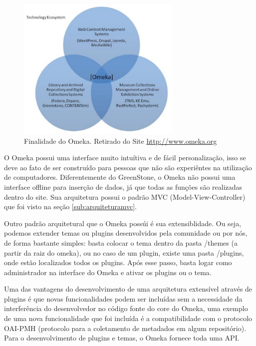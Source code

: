 \graphicspath{{figuras/}}
\begin{figure}[H]
\centering
\includegraphics[width=0.7\textwidth]{finalidade_omeka}
\caption[Finalidade do Omeka]{Finalidade do Omeka. Retirado do Site \url{http://www.omeka.org}}
\label{fig:finalidadeomeka}
\end{figure}

O Omeka possui uma interface muito intuítiva e de fácil personalização, isso se deve ao fato de ser construído para pessoas que não são experiêntes na utilização de computadores. Diferentemente do GreenStone, o Omeka não possui uma interface offline para inserção de dados, já que todas as funções são realizadas dentro do site. Sua arquitetura possui o padrão MVC (Model-View-Controller) que foi visto na seção \ref{sub:arquiteturamvc}.  

Outro padrão arquitetural que o Omeka possúi é sua extensiblidade. Ou seja, podemos extender temas ou plugins desenvolvidos pela comunidade ou por nós, de forma bastante simples: basta colocar o tema dentro da pasta /themes (a partir da raiz do omeka), ou no caso de um plugin, existe uma pasta /plugins, onde estão localizados todos os plugins. Após esse passo, basta logar como administrador na interface do Omeka e ativar os plugins ou o tema.

Uma das vantagens do desenvolvimento de uma arquitetura extensível através de plugins é que novas funcionalidades podem ser incluídas sem a necessidade da interferência do desenvolvedor no código fonte do core do Omeka, uma exemplo de uma nova funcionalidade que foi incluída é a compatibilidade com o protocolo OAI-PMH (protocolo para a coletamento de metadados em algum repositório). Para o desenvolvimento de plugins e temas, o Omeka fornece toda uma API.

